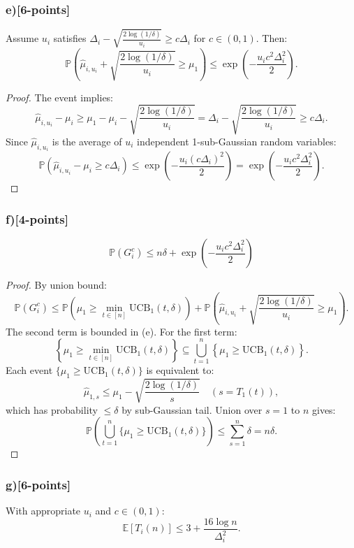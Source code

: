 \documentclass[12pt]{article}
\begin{document}
{{\subsubsection{e)[6-points]}
Assume $u_i$ satisfies $\Delta_i - \sqrt{\frac{2\log(1/\delta)}{u_i}} \geq c \Delta_i$ for $c \in (0,1)$. Then:
\[
\mathbb{P}\left( \hat{\mu}_{i,u_i} + \sqrt{\frac{2\log(1/\delta)}{u_i}} \geq \mu_1 \right) \leq \exp\left(-\frac{u_i c^2 \Delta_i^2}{2}\right).
\]

\begin{proof}
The event implies:
\[
\hat{\mu}_{i,u_i} - \mu_i \geq \mu_1 - \mu_i - \sqrt{\frac{2\log(1/\delta)}{u_i}} = \Delta_i - \sqrt{\frac{2\log(1/\delta)}{u_i}} \geq c \Delta_i.
\]
Since $\hat{\mu}_{i,u_i}$ is the average of $u_i$ independent 1-sub-Gaussian random variables:
\[
\mathbb{P}\left( \hat{\mu}_{i,u_i} - \mu_i \geq c \Delta_i \right) \leq \exp\left(-\frac{u_i (c \Delta_i)^2}{2}\right) = \exp\left(-\frac{u_i c^2 \Delta_i^2}{2}\right).
\]
\end{proof}

\subsubsection{f)[4-points]}
\[
\mathbb{P}(G_i^c) \leq n\delta + \exp\left(-\frac{u_i c^2 \Delta_i^2}{2}\right)
\]

\begin{proof}
By union bound:
\[
\mathbb{P}(G_i^c) \leq \mathbb{P}\left( \mu_1 \geq \min_{t \in [n]} \mathrm{UCB}_1(t, \delta) \right) + \mathbb{P}\left( \hat{\mu}_{i,u_i} + \sqrt{\frac{2\log(1/\delta)}{u_i}} \geq \mu_1 \right).
\]
The second term is bounded in (e). For the first term:
\[
\left\{ \mu_1 \geq \min_{t \in [n]} \mathrm{UCB}_1(t, \delta) \right\} \subseteq \bigcup_{t=1}^n \left\{ \mu_1 \geq \mathrm{UCB}_1(t, \delta) \right\}.
\]
Each event $\{\mu_1 \geq \mathrm{UCB}_1(t, \delta)\}$ is equivalent to:
\[
\hat{\mu}_{1,s} \leq \mu_1 - \sqrt{\frac{2\log(1/\delta)}{s}} \quad (s = T_1(t)),
\]
which has probability $\leq \delta$ by sub-Gaussian tail. Union over $s=1$ to $n$ gives:
\[
\mathbb{P}\left( \bigcup_{t=1}^n \{\mu_1 \geq \mathrm{UCB}_1(t, \delta)\} \right) \leq \sum_{s=1}^n \delta = n\delta.
\]
\end{proof}

\subsubsection{g)[6-points]}
With appropriate $u_i$ and $c \in (0,1)$:
\[
\mathbb{E}[T_i(n)] \leq 3 + \frac{16\log n}{\Delta_i^2}.
\]

}}
\end{document}
